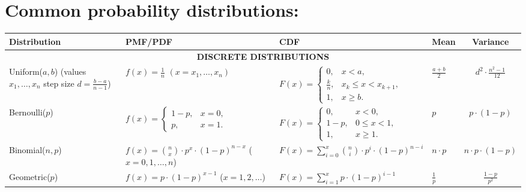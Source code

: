 \documentclass[11pt,a4paper,english]{article} %
\begin{document}
\newpage

\section*{Common probability distributions:}

{\small
    \begin{center}
        \begin{tabular}{m{}m{}m{}m{}c}
            \toprule
                \textbf{Distribution} & \textbf{PMF/PDF} & \textbf{CDF} & \textbf{Mean} & \textbf{Variance} \\ 
            \midrule
                \multicolumn{5}{c}{\textbf{DISCRETE DISTRIBUTIONS}} \\ 
            \midrule
                Uniform($a, b$) \newline (values $x_1, \ldots, x_n$ \newline step size $d = \frac{b-a}{n-1}$) & $f(x) = \frac{1}{n}$ \newline $(x = x_1, \ldots, x_n)$ & $F(x) = \begin{cases} 
                0, & x < a, \\
                \frac{k}{n}, & x_k \leq x < x_{k+1}, \\
                1, & x \geq b.
                \end{cases}$ & $\frac{a+b}{2}$ & $d^2 \cdot \frac{n^2-1}{12}$ \\ 
            \midrule
                Bernoulli($p$) & $f(x) = \begin{cases} 1-p, & x = 0, \\ p, & x = 1. \end{cases}$ & $F(x) = \begin{cases} 
                0, & x < 0, \\
                1-p, & 0 \leq x < 1, \\
                1, & x \geq 1.
                \end{cases}$ & $p$ & $p \cdot (1-p)$ \\ 
            \midrule
                Binomial($n,p$) & $f(x) = \binom{n}{x}\cdot p^x \cdot (1-p)^{n-x}$ \newline ($x = 0, 1, \ldots, n$) & $F(x) = \sum\limits_{i=0}^x \binom{n}{i}\cdot p^i \cdot (1-p)^{n-i}$ & $n\cdot p$ & $n\cdot p\cdot (1-p)$ \\ \midrule
                Geometric($p$) & $f(x) = p \cdot (1-p)^{x-1}$ \newline ($x = 1, 2, \ldots$) & $F(x) = \sum\limits_{i=1}^x p\cdot (1-p)^{i-1}$ & $\frac{1}{p}$ & $\frac{1-p}{p^2}$ \\ \midrule

\end{tabular}
\end{center}}
\end{document}

